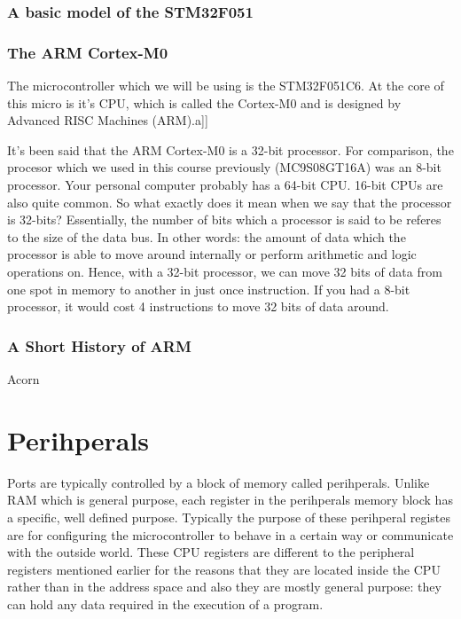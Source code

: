 \subsection{A basic model of the STM32F051}

\subsection{The ARM Cortex-M0}
The microcontroller which we will be using is the STM32F051C6. At the core of this micro is it's CPU, which is called the Cortex-M0 and is designed by Advanced RISC Machines (ARM).a]]

It's been said that the ARM Cortex-M0 is a 32-bit processor. For comparison, the procesor which we used in this course previously (MC9S08GT16A) was an 8-bit processor. Your personal computer probably has a 64-bit CPU. 16-bit CPUs are also quite common. So what exactly does it mean when we say that the processor is 32-bits? Essentially, the number of bits which a processor is said to be referes to the size of the data bus. In other words: the amount of data which the processor is able to move around internally or perform arithmetic and logic operations on. Hence, with a 32-bit processor, we can move 32 bits of data from one spot in memory to another in just once instruction. If you had a 8-bit processor, it would cost 4 instructions to move 32 bits of data around.  



\subsection{A Short History of ARM}
Acorn

\chapter{Perihperals}
Ports are typically controlled by a block of memory called perihperals. Unlike RAM which is general purpose, each register in the perihperals memory block has a specific, well defined purpose. Typically the purpose of these perihperal registes are for configuring the microcontroller to behave in a certain way or communicate with the outside world.
These CPU registers are different to the peripheral registers mentioned earlier for the reasons that they are located inside the CPU rather than in the address space and also they are mostly general purpose: they can hold any data required in the execution of a program. 

